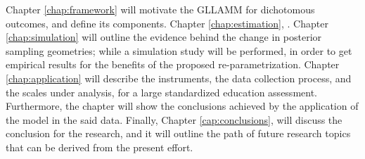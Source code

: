 Chapter \ref{chap:framework} will motivate the GLLAMM for dichotomous outcomes, and define its components. Chapter \ref{chap:estimation}, . Chapter \ref{chap:simulation} will outline the evidence behind the change in posterior sampling geometries; while a simulation study will be performed, in order to get empirical results for the benefits of the proposed re-parametrization. Chapter \ref{chap:application} will describe the instruments, the data collection process, and the scales under analysis, for a large standardized education assessment. Furthermore, the chapter will show the conclusions achieved by the application of the model in the said data. Finally, Chapter \ref{cap:conclusions}, will discuss the conclusion for the research, and it will outline the path of future research topics that can be derived from the present effort.
